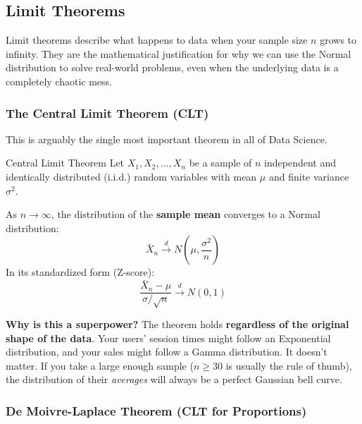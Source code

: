 \documentclass[11pt]{article}
\theoremstyle{smallexample}
\newcommand{\vs}{\vspace{0.2\baselineskip}}
\begin{document}
\subsection{Limit Theorems}

Limit theorems describe what happens to data when your sample size $n$ grows to infinity. They are the mathematical justification for why we can use the Normal distribution to solve real-world problems, even when the underlying data is a completely chaotic mess.

\subsubsection{The Central Limit Theorem (CLT)}

This is arguably the single most important theorem in all of Data Science.

\begin{defbox}{Central Limit Theorem}
Let $X_1, X_2, \ldots, X_n$ be a sample of $n$ independent and identically distributed (i.i.d.) random variables with mean $\mu$ and finite variance $\sigma^2$. 

\vs

As $n \to \infty$, the distribution of the \textbf{sample mean} converges to a Normal distribution:
\begin{equation} \bar{X}_n \xrightarrow{d} N\left(\mu, \frac{\sigma^2}{n}\right) \end{equation}
In its standardized form (Z-score):
\begin{equation}\frac{\bar{X}_n - \mu}{\sigma/\sqrt{n}} \xrightarrow{d} N(0, 1) \end{equation}
\end{defbox}

\textbf{Why is this a superpower?} The theorem holds \textbf{regardless of the original shape of the data}. Your users' session times might follow an Exponential distribution, and your sales might follow a Gamma distribution. It doesn't matter. If you take a large enough sample ($n \geq 30$ is usually the rule of thumb), the distribution of their \textit{averages} will always be a perfect Gaussian bell curve.

  



\subsubsection{De Moivre-Laplace Theorem (CLT for Proportions)}
\end{document}
